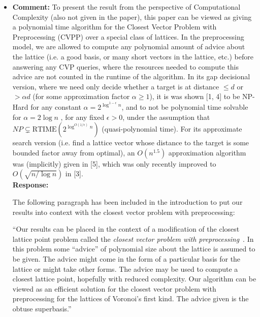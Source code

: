 \documentclass[a4paper,10pt]{article}
\begin{document}
\begin{itemize}
\item\textbf{Comment:} 
To present the result from the perspective of Computational Complexity (also not given in the
paper), this paper can be viewed as giving a polynomial time algorithm for the Closest Vector
Problem with Preprocessing (CVPP) over a special class of lattices. In the preprocessing model,
we are allowed to compute any polynomial amount of advice about the lattice (i.e. a good basis, or many short vectors in the lattice, etc.) before answering any CVP queries, where the resources needed to compute this advice are not counted in the runtime of the algorithm. In its
gap decisional version, where we need only decide whether a target is at distance $\leq d$ or $> \alpha d$
(for some approximation factor $\alpha \geq 1$), it is was shown [1, 4] to be NP-Hard for any constant $\alpha = 2^{\log^{1-\epsilon}n}$, and to not be polynomial time solvable for $\alpha = 2 \log n$ , for any fixed $\epsilon > 0$, under the assumption  that $NP \subsetneq \text{RTIME}(2^{\log^{O(1/\epsilon)}n})$ (quasi-polynomial time). For its approximate search version (i.e. find a lattice vector whose distance to the target is some bounded factor away from optimal), an $O(n^{1.5})$ approximation algorithm was (implicitly) given in [5], which was only recently improved to $O( \sqrt{ n / \log n} )$ in [3].
\\\textbf{Response:}

The following paragraph has been included in the introduction to put our results into context with the closest vector problem with preprocessing:

``Our results can be placed in the context of a modification of the closest lattice point problem called the \emph{closest vector problem with preprocessing}~\cite{micciancio_hardness_2001,feige_inapproximability_2004,Regev_2004_inappox_lattice_with_preprocessing,Aleknovish_hardness_with_preprocessing_2011,knot_hardness_cvvp_2014,Dadush_cvp_with_distance_guarantee_2014}.  In this problem some ``advice'' of polynomial size about the lattice is assumed to be given.  The advice might come in the form of a particular basis for the lattice or might take other forms.  The advice may be used to compute a closest lattice point, hopefully with reduced complexity.  %
Our algorithm can be viewed as an efficient solution for the closest vector problem with preprocessing for the lattices of Voronoi's first kind.  The advice given is the obtuse superbasis.''



\end{itemize}
\end{document}
